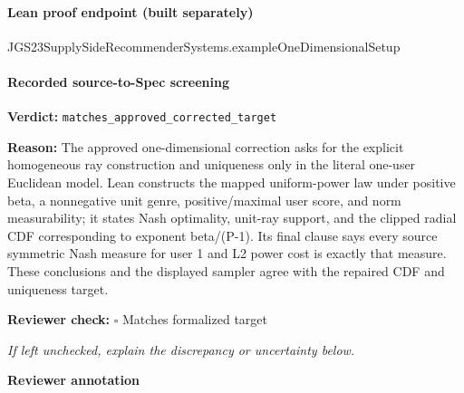 \documentclass[10pt]{article}
\newcommand{\reviewerbox}{%
  \par\noindent\fbox{\parbox{0.96\linewidth}{\rule{0pt}{0.38in}}}\par
}
\newcommand{\reviewmatch}[1]{%
  \par\noindent\textbf{Reviewer check:} $\square$\; #1\par
  \noindent\emph{If left unchecked, explain the discrepancy or uncertainty below.}\par
}
\begin{document}
\paragraph{Lean proof endpoint (built separately)}\begin{ReviewVerbatim}
JGS23SupplySideRecommenderSystems.exampleOneDimensionalSetup
\end{ReviewVerbatim}

\paragraph{Recorded source-to-Spec screening}
\textbf{Verdict:} \texttt{matches\_approved\_corrected\_target}
\\
{\raggedright
\textbf{Reason:} The approved one-\allowbreak{}dimensional correction asks for the explicit homogeneous ray construction and uniqueness only in the literal one-\allowbreak{}user Euclidean model.\allowbreak{} Lean constructs the mapped uniform-\allowbreak{}power law under positive beta, a nonnegative unit genre, positive/\allowbreak{}maximal user score, and norm measurability;\allowbreak{} it states Nash optimality, unit-\allowbreak{}ray support, and the clipped radial CDF corresponding to exponent beta/\allowbreak{}(P-\allowbreak{}1).\allowbreak{} Its final clause says every source symmetric Nash measure for user 1 and L2 power cost is exactly that measure.\allowbreak{} These conclusions and the displayed sampler agree with the repaired CDF and uniqueness target.\allowbreak{}
\par}
\reviewmatch{Matches formalized target}
\noindent\textbf{Reviewer annotation}\par
\reviewerbox
\end{document}
